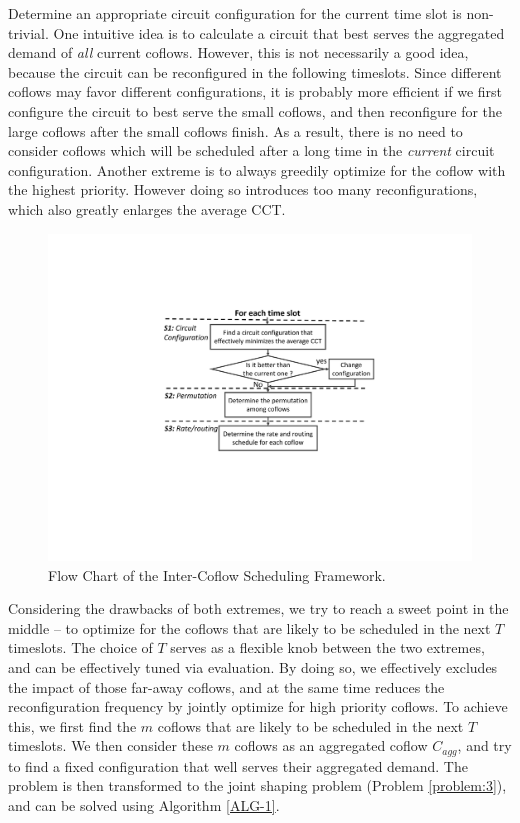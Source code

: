 Determine an appropriate circuit configuration for the current time slot is non-trivial.
One intuitive idea is to calculate a circuit that best serves the aggregated demand of \emph{all} current coflows. However, this is not necessarily a good idea, because the circuit can be reconfigured in the following timeslots. Since different coflows may favor different configurations, it is probably more efficient if we first configure the circuit to best serve the small coflows, and then reconfigure for the large coflows after the small coflows finish. As a result, there is no need to consider coflows which will be scheduled after a long time in the \emph{current} circuit configuration.
Another extreme is to always greedily optimize for the coflow with the highest priority. However doing so introduces too many reconfigurations, which also greatly enlarges the average CCT.

\begin{figure}[t]
  \centering
  \includegraphics[scale=0.51]{figures/F}%
  \caption{Flow Chart of the Inter-Coflow Scheduling Framework.}
  \label{fig:4}
\end{figure}

Considering the drawbacks of both extremes, we try to reach a sweet point in the middle -- to optimize for the coflows that are likely to be scheduled in the next $T$ timeslots.  The choice of $T$ serves as a flexible knob between the two extremes, and can be effectively tuned via evaluation.
By doing so, we effectively excludes the impact of those far-away coflows, and at the same time reduces the reconfiguration frequency by jointly optimize for high priority coflows. To achieve this, we first
find the $m$ coflows that are likely to be scheduled in the next $T$ timeslots.
We then consider these $m$ coflows as an aggregated coflow $C_{agg}$, and try to find a fixed configuration that well serves their aggregated demand. The problem is then transformed to the joint shaping problem (Problem \ref{problem:3}), and can be solved using Algorithm \ref{ALG-1}.

